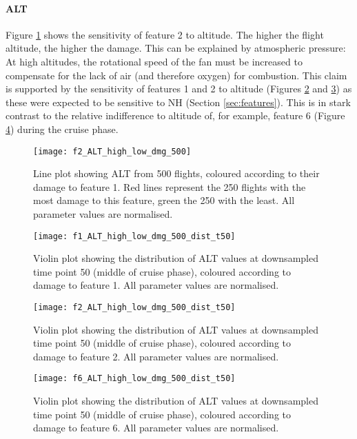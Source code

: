 \paragraph*{ALT}
Figure \ref{fig:high_low_dmg_ALT} shows the sensitivity of feature 2 to altitude. The higher the flight altitude, the higher the damage. This can be explained by atmospheric pressure: At high altitudes, the rotational speed of the fan must be increased to compensate for the lack of air (and therefore oxygen) for combustion. This claim is supported by the sensitivity of features 1 and 2 to altitude (Figures \ref{fig:dmg_violin_ALT_f1} and \ref{fig:dmg_violin_ALT_f2}) as these were expected to be sensitive to NH (Section \ref{sec:features}). This is in stark contrast to the relative indifference to altitude of, for example, feature 6 (Figure \ref{fig:dmg_violin_ALT_f6}) during the cruise phase.

\begin{figure}[tb!]
    \centering
    \texttt{[image: f2\_ALT\_high\_low\_dmg\_500]}
    \caption{\label{fig:high_low_dmg_ALT} Line plot showing ALT from 500 flights, coloured according to their damage to feature 1. Red lines represent the 250 flights with the most damage to this feature, green the 250 with the least. All parameter values are normalised.}
\end{figure}

\begin{figure}[tb!]
    \centering
    \texttt{[image: f1\_ALT\_high\_low\_dmg\_500\_dist\_t50]}
    \caption{\label{fig:dmg_violin_ALT_f1} Violin plot showing the distribution of ALT values at downsampled time point 50 (middle of cruise phase), coloured according to damage to feature 1. All parameter values are normalised.}
\end{figure}

\begin{figure}[tb!]
    \centering
    \texttt{[image: f2\_ALT\_high\_low\_dmg\_500\_dist\_t50]}
    \caption{\label{fig:dmg_violin_ALT_f2} Violin plot showing the distribution of ALT values at downsampled time point 50 (middle of cruise phase), coloured according to damage to feature 2. All parameter values are normalised.}
\end{figure}

\begin{figure}[tb!]
    \centering
    \texttt{[image: f6\_ALT\_high\_low\_dmg\_500\_dist\_t50]}
    \caption{\label{fig:dmg_violin_ALT_f6} Violin plot showing the distribution of ALT values at downsampled time point 50 (middle of cruise phase), coloured according to damage to feature 6. All parameter values are normalised.}
\end{figure}

